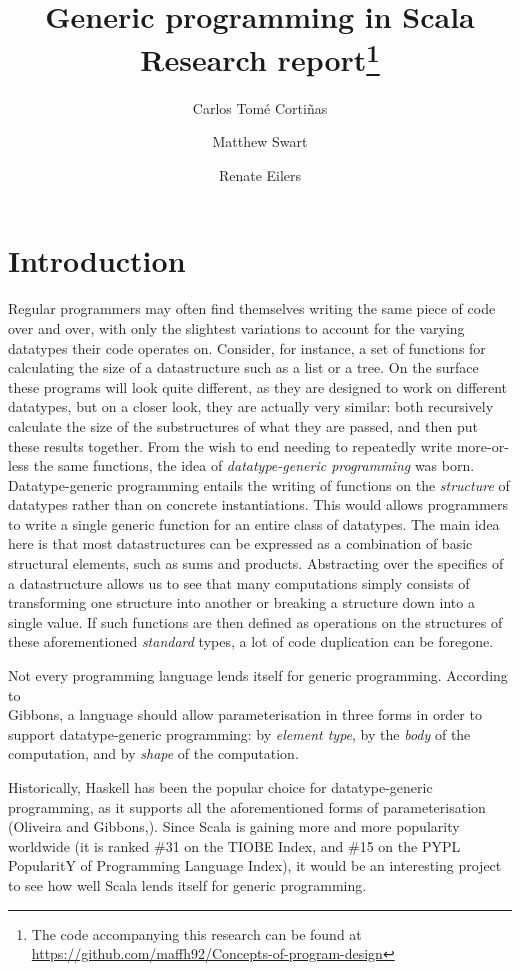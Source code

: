\documentclass[a4paper]{article}
\title{Generic programming in Scala \\ 
\Large{Research report}\footnote{The code accompanying this research can be found at \url{https://github.com/maffh92/Concepts-of-program-design}}}
\author{Carlos Tomé Cortiñas
\and Matthew Swart
\and Renate Eilers}
\begin{document}
\maketitle

\section{Introduction}

Regular programmers may often find themselves writing the same piece of code over and over, with only the slightest variations to account for the varying datatypes their code operates on. Consider, for instance, a set of functions for  calculating the size of a datastructure such as a list or a tree. On the surface these programs will look quite different, as they are designed to work on different datatypes, but on a closer look, they are actually very similar: both recursively calculate the size of the substructures of what they are passed, and then put these results together. From the wish to end needing to repeatedly write more-or-less the same functions, the idea of \emph{datatype-generic programming} was born. Datatype-generic programming entails the writing of functions on the \emph{structure} of datatypes rather than on concrete instantiations. This would allows programmers to write a single generic function for an entire class of datatypes. The main idea here is that most datastructures can be expressed as a combination of basic structural elements, such as sums and products. Abstracting over the specifics of a datastructure allows us to see that many computations simply consists of transforming one structure into another or breaking a structure down into a single value. If such functions are then defined as operations on the structures of these aforementioned \emph{standard} types, a lot of code duplication can be foregone. 

Not every programming language lends itself for generic programming. According to \\ Gibbons\cite{Gibbons06designpatterns}, a language should allow parameterisation in three forms in order to support datatype-generic programming: by \emph{element type}, by the \emph{body} of the computation, and by \emph{shape} of the computation.

Historically, Haskell has been the popular choice for datatype-generic programming, as it supports all the aforementioned forms of parameterisation (Oliveira and Gibbons,\cite{Oliveira08scalafor}). Since Scala is gaining more and more popularity worldwide (it is ranked \#31 on the TIOBE Index\cite{tiobe}, and \#15 on the PYPL PopularitY of Programming Language Index\cite{pypl}), it would be an interesting project to see how well Scala lends itself for generic programming.
\end{document}
